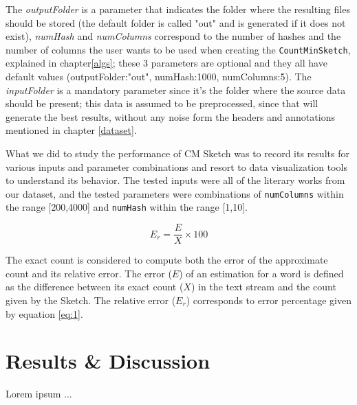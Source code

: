 \documentclass[shortpaper]{revdetua}
\begin{document}
The \textit{outputFolder} is a parameter that indicates the folder where the resulting files should be stored (the default folder is called "out" and is 
generated if it does not exist), \textit{numHash} and \textit{numColumns} correspond to the number of hashes and the number of columns the user wants to be used 
when creating the \texttt{CountMinSketch}, explained in chapter\ref{algs}; these 3 parameters are optional and they all have default values 
(outputFolder:"out", numHash:1000, numColumns:5).
The \textit{inputFolder} is a mandatory parameter since it's the folder where the source data should be present; this data is assumed to be preprocessed, 
since that will generate the best results, without any noise form the headers and annotations mentioned in chapter \ref{dataset}.
\newline

What we did to study the performance of CM Sketch was to record its results for various inputs and parameter combinations and resort to data visualization tools 
to understand its behavior.
The tested inputs were all of the literary works from our dataset, and the tested parameters were combinations of \texttt{numColumns} within the range [200,4000] 
and \texttt{numHash} within the range [1,10].

\begin{equation}
    E_{r} = \frac{E}{X} \times 100
    \label{eq:1}
\end{equation}

\newpage
The exact count is considered to compute both the error of the approximate count and its relative error.
The error ($E$) of an estimation for a word is defined as the difference between its exact count ($X$) in the text stream and the count given by the Sketch.
The relative error ($E_r$) corresponds to error percentage given by equation \ref{eq:1}.







\section{Results \& Discussion} %

Lorem ipsum ...
\end{document}
